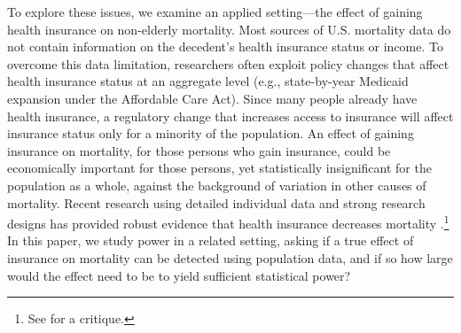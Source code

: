 \documentclass[12pt]{article}%
\begin{document}
To explore these issues, we examine an applied setting—the effect of gaining health insurance on non-elderly mortality. 
Most sources of U.S. mortality data do not contain information on the decedent’s health insurance status or income. 
To overcome this data limitation, researchers often exploit policy changes that affect health insurance status at an aggregate level (e.g., state-by-year Medicaid expansion under the Affordable Care Act). 
Since many people already have health insurance, a regulatory change that increases access to insurance will affect insurance status only for a minority of the population. 
An effect of gaining insurance on mortality, for those persons who gain insurance, could be economically important for those persons, yet statistically insignificant for the population as a whole, against the background of variation in other causes of mortality. 
Recent research using detailed individual data and strong research designs has provided robust evidence that health insurance decreases mortality \citep{millerMedicaidMortalityNew2019,goldinHealthInsuranceMortality2021}.\footnote{See \citet{kaestnerMortalityScienceComment2021} for a critique.}  
In this paper, we study power in a related setting, asking if a true effect of insurance on mortality can be detected using population data, and if so how large would the effect need to be to yield sufficient statistical power?
\end{document}
